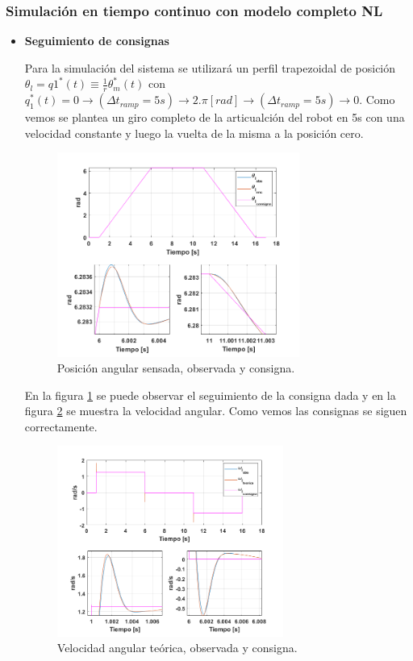 \documentclass[10pt]{article}
\begin{document}
\subsubsection{Simulación en tiempo continuo con modelo completo NL}
\begin{itemize}
	\item \textbf{Seguimiento de consignas}

Para la simulación del sistema se utilizará un perfil trapezoidal de posición 
$\theta_{l}=q1^{*}(t) \equiv \frac{1}{r}\theta^{*}_{m}(t)$ con $q_{1}^{*}(t)=0 \rightarrow (\Delta t_{ramp}=5s) \rightarrow 2.\pi [rad] \rightarrow (\Delta t_{ramp}=5s) \rightarrow 0$. Como vemos se plantea un giro completo de la articualción del robot en 5s
con una velocidad constante y luego la vuelta de la misma a la posición cero.
 \begin{figure}[h!]
	\centering
	\includegraphics[width=0.75\textwidth]{consigna.png}
	\caption{\label{fig:consigna}Posición angular sensada, observada y consigna.}
	\end{figure}

En la figura \ref{fig:consigna} se puede observar el seguimiento de la consigna dada y en la figura \ref{fig:consigna2} se muestra la velocidad angular.
Como vemos las consignas se siguen correctamente.
\begin{figure}[h!]
		\centering
		\includegraphics[width=0.7\textwidth]{consigna2.png}
		\caption{\label{fig:consigna2}Velocidad angular teórica, observada y consigna.}
		\end{figure}


\end{itemize}
\end{document}
